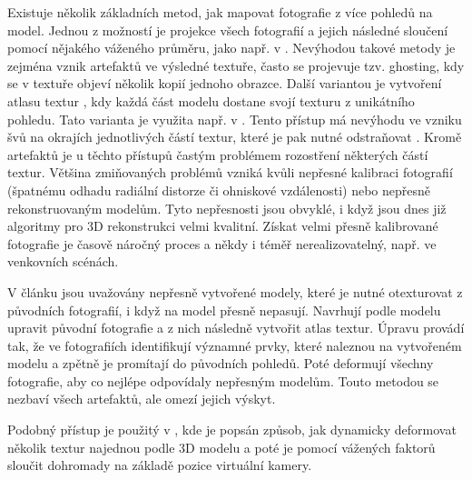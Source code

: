 \documentclass[11pt,twoside,a4paper]{book}
\begin{document}
Existuje několik základních metod, jak mapovat fotografie z více pohledů na
model. Jednou z možností je projekce všech fotografií a jejich následné sloučení
pomocí nějakého váženého průměru, jako např. v \cite{Bernardini01}.
Nevýhodou takové metody je zejména vznik artefaktů ve výsledné textuře, často se
projevuje tzv. ghosting, kdy se v textuře objeví několik kopií jednoho obrazce.
Další variantou je vytvoření atlasu textur \cite{Allene08}, kdy každá část
modelu dostane svojí texturu z unikátního pohledu. Tato varianta je využita
např. v \cite{multi-view-tex}. Tento přístup má nevýhodu ve vzniku švů na
okrajích jednotlivých částí textur, které je pak nutné odstraňovat
\cite{seamless-mosaicing}. Kromě artefaktů je u těchto přístupů častým problémem
rozostření některých částí textur. Většina zmiňovaných problémů vzniká kvůli
nepřesné kalibraci fotografií (špatnému odhadu radiální distorze či ohniskové
vzdálenosti) nebo nepřesně rekonstruovaným modelům. Tyto nepřesnosti jsou
obvyklé, i když jsou dnes již algoritmy pro 3D rekonstrukci velmi kvalitní.
Získat velmi přesně kalibrované fotografie je časově náročný proces a někdy i
téměř nerealizovatelný, např. ve venkovních scénách.

V článku \cite{multi-view-tex} jsou uvažovány nepřesně vytvořené modely, které
je nutné otexturovat z původních fotografií, i když na model přesně nepasují.
Navrhují podle modelu upravit původní fotografie a z nich následně vytvořit
atlas textur. Úpravu provádí tak, že ve fotografiích identifikují významné
prvky, které naleznou na vytvořeném modelu a zpětně je promítají do původních
pohledů. Poté deformují všechny fotografie, aby co nejlépe odpovídaly nepřesným
modelům. Touto metodou se nezbaví všech artefaktů, ale omezí jejich výskyt.

Podobný přístup je použitý v \cite{harmonized-texture-mapping}, kde je
popsán způsob, jak dynamicky deformovat několik textur najednou podle 3D modelu
a poté je pomocí vážených faktorů sloučit dohromady na základě pozice virtuální
kamery.
\end{document}
